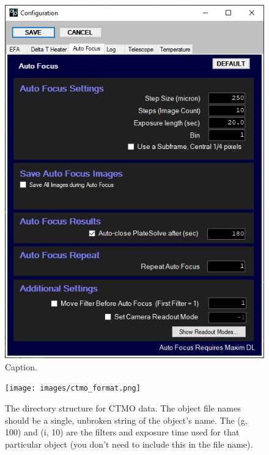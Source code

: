 \documentclass{article}
\begin{document}
	\begin{figure}[htbp!]
		\centering
		\includegraphics[scale=0.6]{images/pwi3-3.png}
		\caption{Caption.}
		\label{fig:pwi3-3}
	\end{figure}
	
	\begin{figure}[htbp!]
		\centering
		\texttt{[image: images/ctmo\_format.png]}
		\caption{The directory structure for CTMO data. The object file names should be a single, unbroken string of the object's name. The (g, 100) and (i, 10) are the filters and exposure time used for that particular object (you don't need to include this in the file name).}
		\label{fig:directory}
	\end{figure}
	
\end{document}
